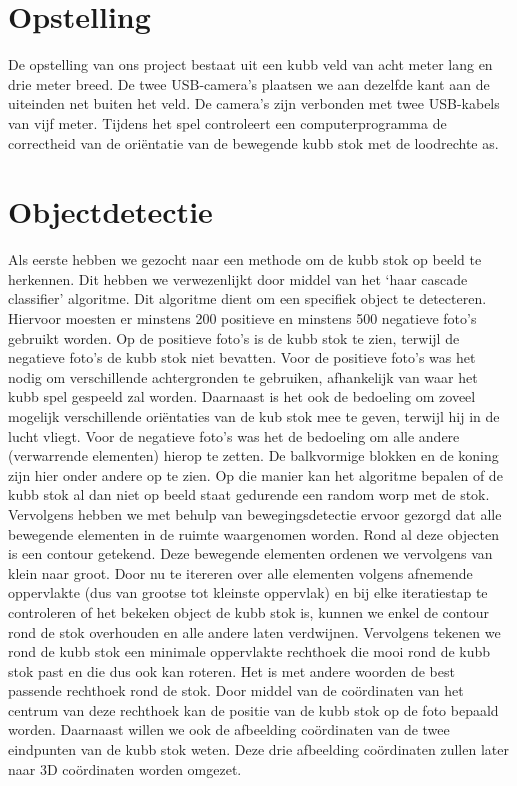 \documentclass[kulak]{kulakarticle} %
\begin{document}
	\section{Opstelling}

	De opstelling van ons project bestaat uit een kubb veld van acht meter lang en drie meter breed. De twee USB-camera’s plaatsen we aan dezelfde kant aan de uiteinden net buiten het veld. De camera’s zijn verbonden met twee USB-kabels van vijf meter. Tijdens het spel controleert een computerprogramma de correctheid van de oriëntatie van de bewegende kubb stok met de loodrechte as.


	\section{Objectdetectie}

	Als eerste hebben we gezocht naar een methode om de kubb stok op beeld te herkennen. Dit hebben we verwezenlijkt door middel van het ‘haar cascade classifier’ algoritme. Dit algoritme dient om een specifiek object te detecteren. Hiervoor moesten er minstens 200 positieve en minstens 500 negatieve foto’s gebruikt worden. Op de positieve foto’s is de kubb stok te zien, terwijl de negatieve foto’s de kubb stok niet bevatten. Voor de positieve foto’s was het nodig om verschillende achtergronden te gebruiken, afhankelijk van waar het kubb spel gespeeld zal worden. Daarnaast is het ook de bedoeling om zoveel mogelijk verschillende oriëntaties van de kub stok mee te geven, terwijl hij in de lucht vliegt. Voor de negatieve foto’s was het de bedoeling om alle andere (verwarrende elementen) hierop te zetten. De balkvormige blokken en de koning zijn hier onder andere op te zien. Op die manier kan het algoritme bepalen of de kubb stok al dan niet op beeld staat gedurende een random worp met de stok. 
	Vervolgens hebben we met behulp van bewegingsdetectie ervoor gezorgd dat alle bewegende elementen in de ruimte waargenomen worden. Rond al deze objecten is een contour getekend. Deze bewegende elementen ordenen we vervolgens van klein naar groot. Door nu te itereren over alle elementen volgens afnemende oppervlakte (dus van grootse tot kleinste oppervlak) en bij elke iteratiestap te controleren of het bekeken object de kubb stok is, kunnen we enkel de contour rond de stok overhouden en alle andere laten verdwijnen. Vervolgens tekenen we rond de kubb stok een minimale oppervlakte rechthoek die mooi rond de kubb stok past en die dus ook kan roteren. Het is met andere woorden de best passende rechthoek rond de stok. Door middel van de coördinaten van het centrum van deze rechthoek kan de positie van de kubb stok op de foto bepaald worden. Daarnaast willen we ook de afbeelding coördinaten van de twee eindpunten van de kubb stok weten. Deze drie afbeelding coördinaten zullen later naar 3D coördinaten worden omgezet. 
\end{document}
